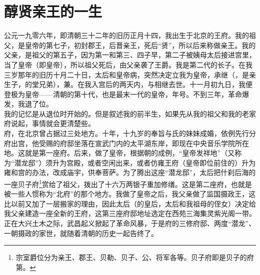 \fancyhead[RO]{} %
\fancyhead[LE]{} %
\chapter*{醇贤亲王的一生}
\thispagestyle{empty}
  公元一九零六年，即清朝三十二年的旧历正月十四，我出生于北京的王府。我的祖父，是皇帝的第七子，初封郡王，后晋亲王，死后“贤”，所以后来称做亲王。我的父亲，是祖父的第五子，因为第一和第三、四子早，第二子被姨母太后接进宫里，当了皇帝（即皇帝），所以祖父死后，由父亲袭了王爵。我是第二代的长子。在我三岁那年的旧历十月二十日，太后和皇帝病，突然决定立我为皇帝，承继（，是亲生子，的堂兄弟），兼。在我入宫后的两天内，与相继去世。十一月初九日，我便登极为皇帝——清朝的第十代，也是最末一代的皇帝，年号。不到三年，革命爆发，我退了位。\\

  我的记忆是从退位时开始的。但是叙述我的前半生，如果先从我的祖父和我的老家府说起，事情就会更清楚些。\\

  府，在北京曾占据过三处地方。十年，十九岁的奉旨与氏的妹妹成婚，依例先行分府出宫，他受赐的府邸坐落在宣武门内的太平湖东岸，即现在中央音乐学院所在地。这就是第一座府。后来，做了皇帝，根据朝的成例，“皇帝发祥地”（又称为“潜龙邸”）须升为宫殿，或者空闲出来，或者仿雍王府（皇帝即位前住的）升为雍和宫的办法，改成庙宇，供奉菩萨。为了腾出这座“潜龙邸”，太后把什刹后海的一座贝子府\footnote{宗室爵位分为亲王、郡王、贝勒、贝子、公、将军各等。贝子府即是贝子的府第。}赏给了祖父，拨出了十六万两银子重加修缮。这是第二座府，也就是被一些人惯称为“北府”的那个地方。我做了皇帝之后，我父亲做了监国摄政王，这比以前又加了一层搬家的理由，因此太后（的皇后，太后和我祖母的侄女）决定给我父亲建造一座全新的王府，这第三座府邸地址选定在西苑三海集灵紫光阁一带。正在大兴土木之际，武昌起义掀起了革命风暴，于是府的三修府邸、两度“潜龙”、一朝摄政的家世，就随着清朝的历史一起告终了。\\

